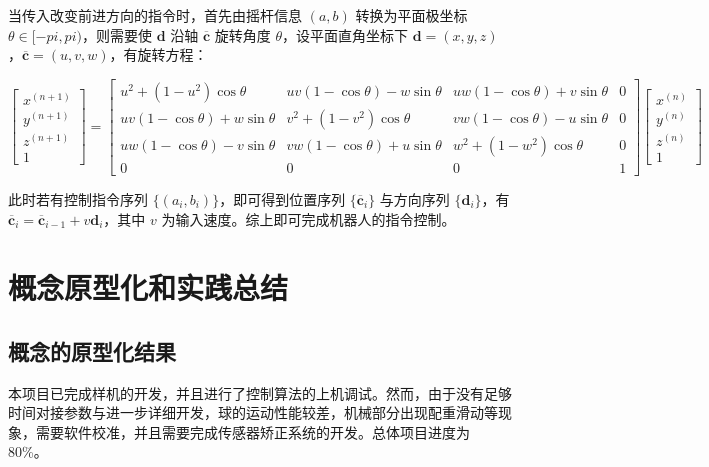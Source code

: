 \documentclass[a4paper]{ctexart}
\numberwithin{equation}{section}
\numberwithin{table}{section}
\numberwithin{figure}{section}
\begin{document}
当传入改变前进方向的指令时，首先由摇杆信息 $(a,b)$ 转换为平面极坐标 $\theta \in [-pi,pi)$，则需要使 $\boldsymbol d$ 沿轴 $\overline{\boldsymbol c}$ 旋转角度 $\theta$，设平面直角坐标下 $\boldsymbol d=(x,y,z)$，$\overline{\boldsymbol c}=(u,v,w)$，有旋转方程：

\begin{equation}
  \begin{bmatrix}
    x^{(n+1)} \\
    y^{(n+1)} \\
    z^{(n+1)} \\
    1
  \end{bmatrix}
  =
  \begin{bmatrix}
    u^2+(1-u^2)\cos\theta & uv(1-\cos\theta)-w\sin\theta & uw(1-\cos\theta)+v\sin\theta & 0\\
    uv(1-\cos\theta)+w\sin\theta & v^2+(1-v^2)\cos\theta & vw(1-\cos\theta)-u\sin\theta & 0\\
    uw(1-\cos\theta)-v\sin\theta & vw(1-\cos\theta)+u\sin\theta & w^2+(1-w^2)\cos\theta & 0\\
    0 & 0 & 0 & 1
  \end{bmatrix}
  \begin{bmatrix}
    x^{(n)} \\
    y^{(n)} \\
    z^{(n)} \\
    1
  \end{bmatrix}
\end{equation}

此时若有控制指令序列 $\{(a_i,b_i)\}$，即可得到位置序列 $\{\overline{\boldsymbol c}_i\}$ 与方向序列 $\{\boldsymbol d_i\}$，有 $\overline{\boldsymbol c}_i = \overline{\boldsymbol c}_{i-1} + v\boldsymbol d_i$，其中 $v$ 为输入速度。综上即可完成机器人的指令控制。

\section{概念原型化和实践总结}

\subsection{概念的原型化结果}

本项目已完成样机的开发，并且进行了控制算法的上机调试。然而，由于没有足够时间对接参数与进一步详细开发，球的运动性能较差，机械部分出现配重滑动等现象，需要软件校准，并且需要完成传感器矫正系统的开发。总体项目进度为 80\%。
\end{document}
